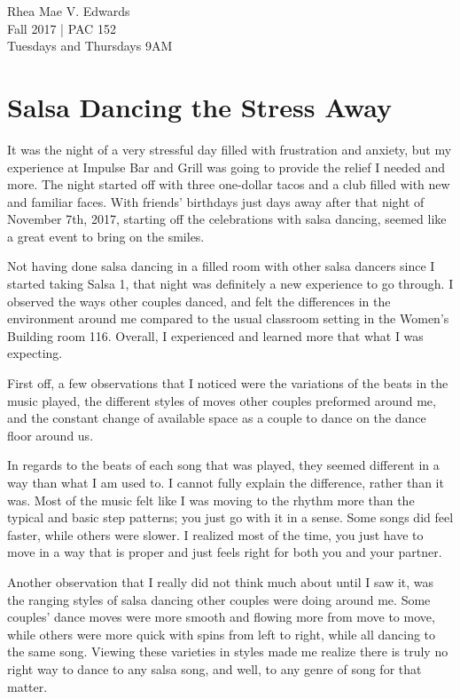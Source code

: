 \documentclass[letterpaper,12pt,onecolumn]{IEEEtran}
\begin{document}
\noindent
Rhea Mae V. Edwards\\
Fall 2017 | PAC 152\\ 
Tuesdays and Thursdays 9AM

\section*{Salsa Dancing the Stress Away}


It was the night of a very stressful day filled with frustration and anxiety, but my experience at Impulse Bar and Grill was going to provide the relief I needed and more. The night started off with three one-dollar tacos and a club filled with new and familiar faces. With friends' birthdays just days away after that night of November 7th, 2017, starting off the celebrations with salsa dancing, seemed like a great event to bring on the smiles.

Not having done salsa dancing in a filled room with other salsa dancers since I started taking Salsa 1, that night was definitely a new experience to go through. I observed the ways other couples danced, and felt the differences in the environment around me compared to the usual classroom setting in the Women's Building room 116. Overall, I experienced and learned more that what I was expecting.

First off, a few observations that I noticed were the variations of the beats in the music played, the different styles of moves other couples preformed around me, and the constant change of available space as a couple to dance on the dance floor around us. 

In regards to the beats of each song that was played, they seemed different in a way than what I am used to. I cannot fully explain the difference, rather than it was. Most of the music felt like I was moving to the rhythm more than the typical and basic step patterns; you just go with it in a sense. Some songs did feel faster, while others were slower. I realized most of the time, you just have to move in a way that is proper and just feels right for both you and your partner.

Another observation that I really did not think much about until I saw it, was the ranging styles of salsa dancing other couples were doing around me. Some couples' dance moves were more smooth and flowing more from move to move, while others were more quick with spins from left to right, while all dancing to the same song. Viewing these varieties in styles made me realize there is truly no right way to dance to any salsa song, and well, to any genre of song for that matter.
\end{document}
